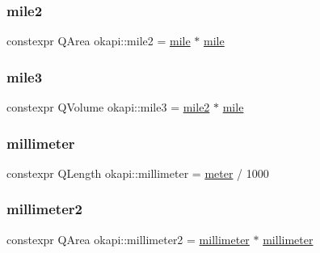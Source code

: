 \mbox{\label{namespaceokapi_afa03e58d2dcfa00d61968ef1c183909d}} 
\subsubsection{\texorpdfstring{mile2}{mile2}}
{\footnotesize\ttfamily constexpr Q\+Area okapi\+::mile2 = \mbox{\hyperlink{namespaceokapi_adb797d6d549d23e9b2e6c817a07ddfba}{mile}} $\ast$ \mbox{\hyperlink{namespaceokapi_adb797d6d549d23e9b2e6c817a07ddfba}{mile}}}

\mbox{\label{namespaceokapi_a01976bc3ef4067a1146756d3853cf137}} 
\subsubsection{\texorpdfstring{mile3}{mile3}}
{\footnotesize\ttfamily constexpr Q\+Volume okapi\+::mile3 = \mbox{\hyperlink{namespaceokapi_afa03e58d2dcfa00d61968ef1c183909d}{mile2}} $\ast$ \mbox{\hyperlink{namespaceokapi_adb797d6d549d23e9b2e6c817a07ddfba}{mile}}}

\mbox{\label{namespaceokapi_a9343219094a8231c1e3bc95505ba1227}} 
\subsubsection{\texorpdfstring{millimeter}{millimeter}}
{\footnotesize\ttfamily constexpr Q\+Length okapi\+::millimeter = \mbox{\hyperlink{namespaceokapi_a59563b3d4b18633f1c8d852e2932d1db}{meter}} / 1000}

\mbox{\label{namespaceokapi_a846f4e01f428ad9bff90f8dd7f7610d8}} 
\subsubsection{\texorpdfstring{millimeter2}{millimeter2}}
{\footnotesize\ttfamily constexpr Q\+Area okapi\+::millimeter2 = \mbox{\hyperlink{namespaceokapi_a9343219094a8231c1e3bc95505ba1227}{millimeter}} $\ast$ \mbox{\hyperlink{namespaceokapi_a9343219094a8231c1e3bc95505ba1227}{millimeter}}}

